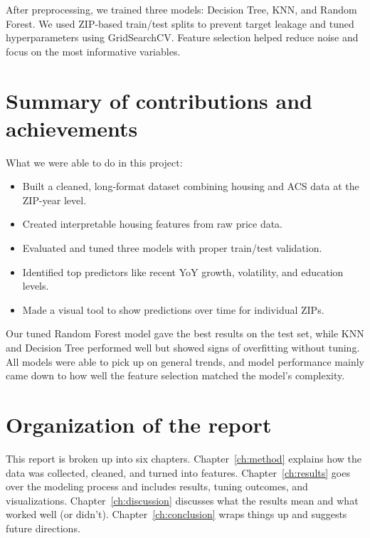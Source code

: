 After preprocessing, we trained three models: Decision Tree, KNN, and Random Forest. We used ZIP-based train/test splits to prevent target leakage and tuned hyperparameters using GridSearchCV. Feature selection helped reduce noise and focus on the most informative variables.

\section{Summary of contributions and achievements}
\label{sec:intro_sum_results}

What we were able to do in this project:
\begin{itemize}
    \item Built a cleaned, long-format dataset combining housing and ACS data at the ZIP-year level.
    \item Created interpretable housing features from raw price data.
    \item Evaluated and tuned three models with proper train/test validation.
    \item Identified top predictors like recent YoY growth, volatility, and education levels.
    \item Made a visual tool to show predictions over time for individual ZIPs.
\end{itemize}

Our tuned Random Forest model gave the best results on the test set, while KNN and Decision Tree performed well but showed signs of overfitting without tuning. All models were able to pick up on general trends, and model performance mainly came down to how well the feature selection matched the model’s complexity.

\section{Organization of the report}
\label{sec:intro_org}

This report is broken up into six chapters. Chapter~\ref{ch:method} explains how the data was collected, cleaned, and turned into features. Chapter~\ref{ch:results} goes over the modeling process and includes results, tuning outcomes, and visualizations. Chapter~\ref{ch:discussion} discusses what the results mean and what worked well (or didn’t). Chapter~\ref{ch:conclusion} wraps things up and suggests future directions.
